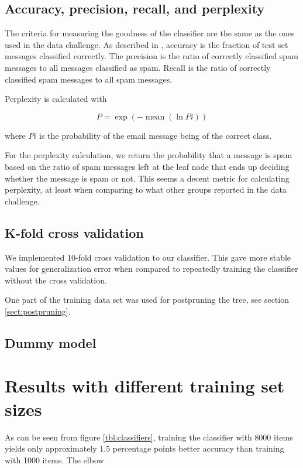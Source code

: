 \documentclass[a4paper,10pt]{article}
\begin{document}
\subsection{Accuracy, precision, recall, and perplexity}

The criteria for measuring the goodness of the classifier are the same
as the ones used in the data challenge.  As described in
\cite{termproject}, accuracy is the fraction of test set messages
classified correctly.  The precision is the ratio of correctly
classified spam messages to all messages classified as spam.  Recall is
the ratio of correctly classified spam messages to all spam messages.

Perplexity is calculated with

\begin{equation}
P = \exp(-\operatorname{mean}(\ln{Pi}))
\end{equation}

where $Pi$ is the probability of the email message being of the correct
class.

For the perplexity calculation, we return the probability that a message
is spam based on the ratio of spam messages left at the leaf node that
ends up deciding whether the message is spam or not.  This seems a
decent metric for calculating perplexity, at least when comparing to
what other groups reported in the data challenge.

\subsection{K-fold cross validation}

We implemented 10-fold cross validation to our classifier.  This
gave more stable values for generalization error when compared to
repeatedly training the classifier without the cross validation.

One part of the training data set was used for postpruning the tree, see
section \ref{sect:postpruning}.

\subsection{Dummy model}


\section{Results with different training set sizes}

As can be seen from figure \ref{tbl:classifiers}, training the
classifier with 8000 items yields only approximately 1.5 percentage
points better accuracy than training with 1000 items.  The elbow 
\end{document}
